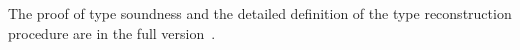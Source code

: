 The proof of type soundness and the detailed definition of the type
reconstruction procedure are in the full version~\cite{fullversion}.






